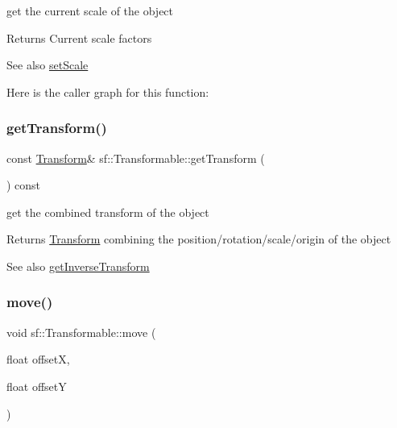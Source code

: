 get the current scale of the object 

\begin{DoxyReturn}{Returns}
Current scale factors
\end{DoxyReturn}
\begin{DoxySeeAlso}{See also}
\hyperlink{classsf_1_1_transformable_aaec50b46b3f41b054763304d1e727471}{set\+Scale} 
\end{DoxySeeAlso}
Here is the caller graph for this function\+:
\mbox{\label{classsf_1_1_transformable_a7f7c3f0bab3f162b13613904fbdbb9ad}} 
\subsubsection{\texorpdfstring{get\+Transform()}{getTransform()}}
{\footnotesize\ttfamily const \hyperlink{classsf_1_1_transform}{Transform}\& sf\+::\+Transformable\+::get\+Transform (\begin{DoxyParamCaption}{ }\end{DoxyParamCaption}) const}



get the combined transform of the object 

\begin{DoxyReturn}{Returns}
\hyperlink{classsf_1_1_transform}{Transform} combining the position/rotation/scale/origin of the object
\end{DoxyReturn}
\begin{DoxySeeAlso}{See also}
\hyperlink{classsf_1_1_transformable_ab18b25f51263252ff3811465eb7e9fb1}{get\+Inverse\+Transform} 
\end{DoxySeeAlso}
\mbox{\label{classsf_1_1_transformable_a86b461d6a941ad390c2ad8b6a4a20391}} 
\subsubsection{\texorpdfstring{move()}{move()}\hspace{0.1cm}{\footnotesize\ttfamily [1/2]}}
{\footnotesize\ttfamily void sf\+::\+Transformable\+::move (\begin{DoxyParamCaption}\item[{float}]{offsetX,  }\item[{float}]{offsetY }\end{DoxyParamCaption})}



